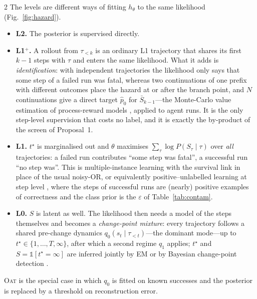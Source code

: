 \begin{multicols}{2}
The levels are different ways of fitting $h_\theta$ to the same likelihood (Fig.~\ref{fig:hazard}).
\begin{itemize}[leftmargin=1.1em]
\item \textbf{L2.} The posterior is supervised directly.
\item \textbf{L1$^{+}$.} A rollout from $\tau_{<k}$ is an ordinary L1 trajectory that shares its first $k-1$ steps with $\tau$ and enters the same likelihood. What it adds is \emph{identification}: with independent trajectories the likelihood only says that some step of a failed run was fatal, whereas two continuations of one prefix with different outcomes place the hazard at or after the branch point, and $N$ continuations give a direct target $\hat p_0$ for $\bar S_{k-1}$---the Monte-Carlo value estimation of process-reward models \cite{wang2024mathshepherd}, applied to agent runs. It is the only step-level supervision that costs no label, and it is exactly the by-product of the screen of Proposal~1.
\item \textbf{L1.} $t^\star$ is marginalised out and $\theta$ maximises $\sum_\tau\log P(S_\tau\mid\tau)$ over \emph{all} trajectories: a failed run contributes ``some step was fatal'', a successful run ``no step was''. This is multiple-instance learning \cite{dietterich1997mil} with the survival link in place of the usual noisy-OR, or equivalently positive--unlabelled learning at step level \cite{elkan2008pu,kiryo2017nnpu}, where the steps of successful runs are (nearly) positive examples of correctness and the class prior is the $\varepsilon$ of Table~\ref{tab:contam}.
\item \textbf{L0.} $S$ is latent as well. The likelihood then needs a model of the steps themselves and becomes a \emph{change-point mixture}: every trajectory follows a shared pre-change dynamics $q_0(s_t\mid\tau_{<t})$---the dominant mode---up to $t^\star\in\{1,\dots,T,\infty\}$, after which a second regime $q_1$ applies; $t^\star$ and $S=\mathbb{1}[t^\star{=}\infty]$ are inferred jointly by EM or by Bayesian change-point detection \cite{adams2007bocpd}.
\end{itemize}
\textsc{Oat} is the special case in which $q_0$ is fitted on known successes and the posterior is replaced by a threshold on reconstruction error.


\end{multicols}
